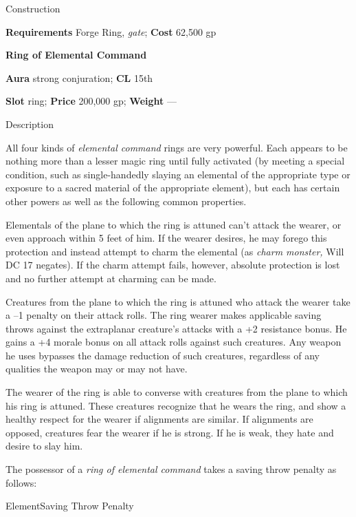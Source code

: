 Construction
				
\textbf{Requirements} Forge Ring, \textit{gate}; \textbf{Cost }62,500 gp
				
\textbf{Ring of Elemental Command}
				
\textbf{Aura} strong conjuration; \textbf{CL} 15th
				
\textbf{Slot} ring; \textbf{Price} 200,000 gp; \textbf{Weight} ---
				
Description
				
All four kinds of \textit{elemental command }rings are very powerful. Each appears to be nothing more than a lesser magic ring until fully activated (by meeting a special condition, such as single-handedly slaying an elemental of the appropriate type or exposure to a sacred material of the appropriate element), but each has certain other powers as well as the following common properties.
				
Elementals of the plane to which the ring is attuned can't attack the wearer, or even approach within 5 feet of him. If the wearer desires, he may forego this protection and instead attempt to charm the elemental (as \textit{charm monster, }Will DC 17 negates). If the charm attempt fails, however, absolute protection is lost and no further attempt at charming can be made.
				
Creatures from the plane to which the ring is attuned who attack the wearer take a --1 penalty on their attack rolls. The ring wearer makes applicable saving throws against the extraplanar creature's attacks with a +2 resistance bonus. He gains a +4 morale bonus on all attack rolls against such creatures. Any weapon he uses bypasses the damage reduction of such creatures, regardless of any qualities the weapon may or may not have.
				
The wearer of the ring is able to converse with creatures from the plane to which his ring is attuned. These creatures recognize that he wears the ring, and show a healthy respect for the wearer if alignments are similar. If alignments are opposed, creatures fear the wearer if he is strong. If he is weak, they hate and desire to slay him.
				
The possessor of a \textit{ring of elemental command }takes a saving throw penalty as follows:

ElementSaving Throw Penalty


